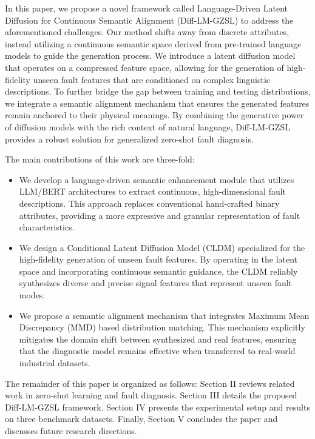 In this paper, we propose a novel framework called Language-Driven Latent Diffusion for Continuous Semantic Alignment (Diff-LM-GZSL) to address the aforementioned challenges. Our method shifts away from discrete attributes, instead utilizing a continuous semantic space derived from pre-trained language models to guide the generation process. We introduce a latent diffusion model that operates on a compressed feature space, allowing for the generation of high-fidelity unseen fault features that are conditioned on complex linguistic descriptions. To further bridge the gap between training and testing distributions, we integrate a semantic alignment mechanism that ensures the generated features remain anchored to their physical meanings. By combining the generative power of diffusion models with the rich context of natural language, Diff-LM-GZSL provides a robust solution for generalized zero-shot fault diagnosis.

The main contributions of this work are three-fold:
\begin{itemize}
    \item We develop a language-driven semantic enhancement module that utilizes LLM/BERT architectures to extract continuous, high-dimensional fault descriptions. This approach replaces conventional hand-crafted binary attributes, providing a more expressive and granular representation of fault characteristics.
    \item We design a Conditional Latent Diffusion Model (CLDM) specialized for the high-fidelity generation of unseen fault features. By operating in the latent space and incorporating continuous semantic guidance, the CLDM reliably synthesizes diverse and precise signal features that represent unseen fault modes.
    \item We propose a semantic alignment mechanism that integrates Maximum Mean Discrepancy (MMD) based distribution matching. This mechanism explicitly mitigates the domain shift between synthesized and real features, ensuring that the diagnostic model remains effective when transferred to real-world industrial datasets.
\end{itemize}

The remainder of this paper is organized as follows: Section II reviews related work in zero-shot learning and fault diagnosis. Section III details the proposed Diff-LM-GZSL framework. Section IV presents the experimental setup and results on three benchmark datasets. Finally, Section V concludes the paper and discusses future research directions.

